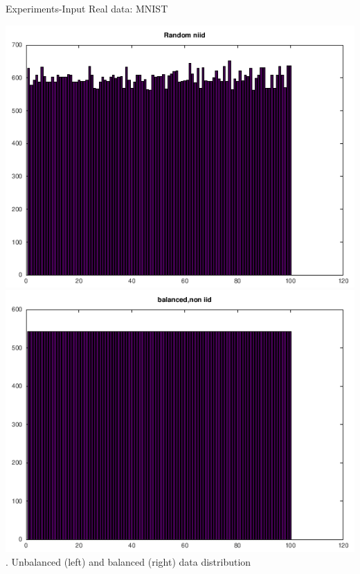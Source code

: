 \documentclass{beamer}
\begin{document}
\begin{frame}{Experiments-Input
	}
	Real data: MNIST\\
\begin{center}
	\includegraphics[scale=0.3]{random_niid.png}
	\includegraphics[scale=0.3]{equal.png}\\
	\figurename{. Unbalanced (left) and balanced (right) data distribution}
\end{center}
	\end{frame}
\end{document}
